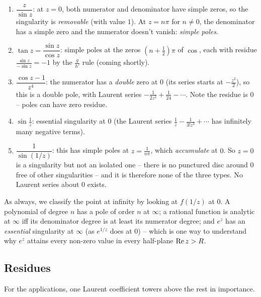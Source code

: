 \documentclass[a4paper]{scrartcl}
\begin{document}
\begin{example}
	\begin{enumerate}[label=(\roman*)]
		\item $\dfrac{z}{\sin z}$: at $z = 0$, both numerator and denominator have simple zeros, so the singularity is \emph{removable} (with value $1$). At $z = n\pi$ for $n \neq 0$, the denominator has a simple zero and the numerator doesn't vanish: \emph{simple poles}.
		\item $\tan z = \dfrac{\sin z}{\cos z}$: simple poles at the zeros $\left(n + \frac 12\right)\pi$ of $\cos$, each with residue $\frac{\sin z}{-\sin z} = -1$ by the $\frac{g}{h'}$ rule (coming shortly).
		\item $\dfrac{\cos z - 1}{z^4}$: the numerator has a \emph{double} zero at $0$ (its series starts at $-\frac{z^2}{2}$), so this is a double pole, with Laurent series $-\frac{1}{2z^2} + \frac{1}{24} - \cdots$. Note the residue is $0$ -- poles can have zero residue.
		\item $\sin \frac 1z$: essential singularity at $0$ (the Laurent series $\frac 1z - \frac{1}{3! z^3} + \cdots$ has infinitely many negative terms).
		\item $\dfrac{1}{\sin(1/ z)}$: this has simple poles at $z = \frac{1}{n\pi}$, which \emph{accumulate} at $0$. So $z = 0$ is a singularity but not an isolated one -- there is no punctured disc around $0$ free of other singularities -- and it is therefore none of the three types. No Laurent series about $0$ exists.
	\end{enumerate}
\end{example}

\begin{remark}
	As always, we classify the point at infinity by looking at $f(1/z)$ at $0$. A polynomial of degree $n$ has a pole of order $n$ at $\infty$; a rational function is analytic at $\infty$ iff its denominator degree is at least its numerator degree; and $e^z$ has an \emph{essential} singularity at $\infty$ (as $e^{1/z}$ does at $0$) -- which is one way to understand why $e^z$ attains every non-zero value in every half-plane $\operatorname{Re} z > R$.
\end{remark}

\subsection{Residues}

For the applications, one Laurent coefficient towers above the rest in importance.
\end{document}
